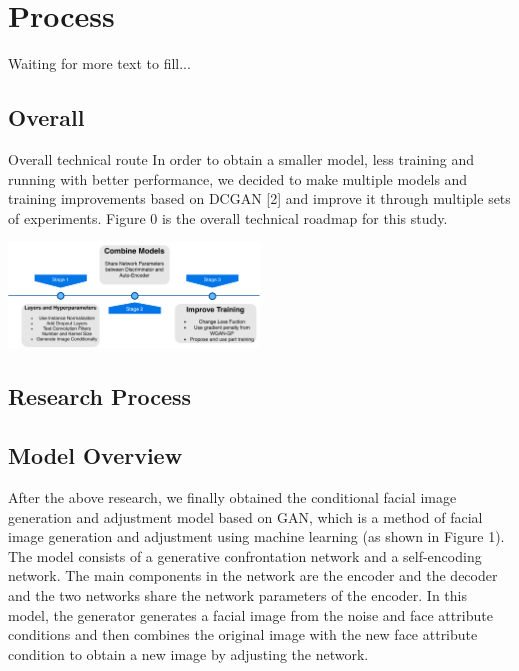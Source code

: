 \section{Process}
Waiting for more text to fill...
\subsection{Overall}
Overall technical route
In order to obtain a smaller model, less training and running with better performance, we decided to make multiple models and training improvements based on DCGAN [2] and improve it through multiple sets of experiments.
Figure 0 is the overall technical roadmap for this study.

% 
\centering
\includegraphics[width=0.5\textwidth]{figures/roadmap.pdf}


\subsection{Research Process}

\subsection{Model Overview}
After the above research, we finally obtained the conditional facial image generation and adjustment model based on GAN,
    which is a method of facial image generation and adjustment using machine learning
    (as shown in Figure 1).
The model consists of a generative confrontation network and a self-encoding network. 
The main components in the network are the encoder and the decoder and the two networks share the network parameters of the encoder. 
In this model, the generator generates a facial image from the noise and face attribute conditions and then combines the original image with the new face attribute condition to obtain a new image by adjusting the network.

